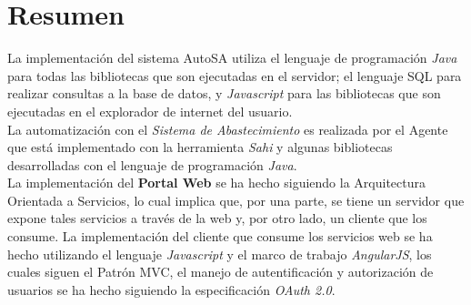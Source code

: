 %



%

\section{Resumen}
La implementación del sistema AutoSA utiliza el lenguaje de programación \textit{Java} para todas las bibliotecas que son ejecutadas en el servidor; el lenguaje SQL para realizar consultas a la base de datos, y \textit{Javascript} para las bibliotecas que son ejecutadas en el explorador de internet del usuario.\\
La automatización con el \textit{Sistema de Abastecimiento} es realizada por el Agente que está implementado con la herramienta \textit{Sahi} y algunas bibliotecas desarrolladas con el lenguaje de programación \textit{Java}.\\
La implementación del \textbf{Portal Web} se ha hecho siguiendo la Arquitectura Orientada a Servicios, lo cual implica que, por una parte, se tiene un servidor que expone tales servicios a través de la web y, por otro lado, un cliente que los consume. La implementación del cliente que consume los servicios web se ha hecho utilizando el lenguaje \textit{Javascript} y el marco de trabajo \textit{AngularJS}, los cuales siguen el Patrón MVC, el manejo de autentificación y autorización de usuarios se ha hecho siguiendo la especificación \textit{OAuth 2.0}.
